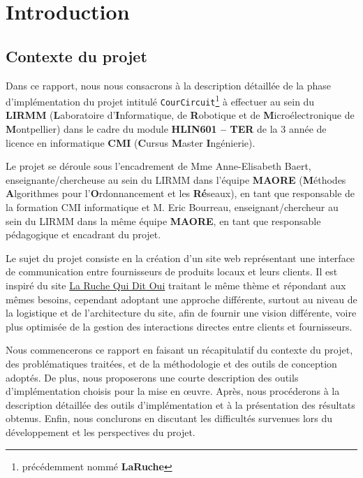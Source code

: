 \documentclass[a4paper,12pt]{report}
\theoremstyle{break}
\theoremstyle{break}
\theoremstyle{break}
\theoremstyle{break}
\theoremstyle{definition}
\theoremstyle{remark}
\begin{document}
\chapter{Introduction}
\setcounter{page}{1}
\section{Contexte du projet}
Dans ce rapport, nous nous consacrons à la description détaillée de la phase d'implémentation du projet intitulé \texttt{CourCircuit}\footnote{précédemment nommé \textbf{LaRuche}} à effectuer au sein du \textbf{LIRMM} (\textbf{L}aboratoire d'\textbf{I}nformatique, de \textbf{R}obotique et de \textbf{M}icroélectronique de \textbf{M}ontpellier) dans le cadre du module \textbf{HLIN601 -- TER} de la $3$\ieme{} année de licence en informatique \textbf{CMI} (\textbf{C}ursus \textbf{M}aster \textbf{I}ngénierie).

Le projet se déroule sous l'encadrement de Mme Anne-Elisabeth Baert, enseignante/chercheuse au sein du LIRMM dans l'équipe \textbf{MAORE} (\textbf{M}éthodes \textbf{A}lgorithmes pour l'\textbf{O}rdonnancement et les \textbf{Ré}seaux), en tant que responsable de la formation CMI informatique et M. Eric Bourreau, enseignant/chercheur au sein du LIRMM dans la même équipe \textbf{MAORE}, en tant que responsable pédagogique et encadrant du projet.

Le sujet du projet consiste en la création d'un site web représentant une interface de communication entre fournisseurs de produits locaux et leurs clients. Il est inspiré du site \og \href{https://laruchequiditoui.fr/fr}{La Ruche Qui Dit Oui} \fg traitant le même thème et répondant aux mêmes besoins, cependant adoptant une approche différente, surtout au niveau de la logistique et de l'architecture du site, afin de fournir une vision différente, voire plus optimisée de la gestion des interactions directes entre clients et fournisseurs.

Nous commencerons ce rapport en faisant un récapitulatif du contexte du projet, des problématiques traitées, et de la méthodologie et des outils de conception adoptés. De plus, nous proposerons une courte description des outils d'implémentation choisis pour la mise en \oe{}uvre. Après, nous procéderons à la description détaillée des outils d'implémentation et à la présentation des résultats obtenus. Enfin, nous conclurons en discutant les difficultés survenues lors du développement et les perspectives du projet.
\end{document}
